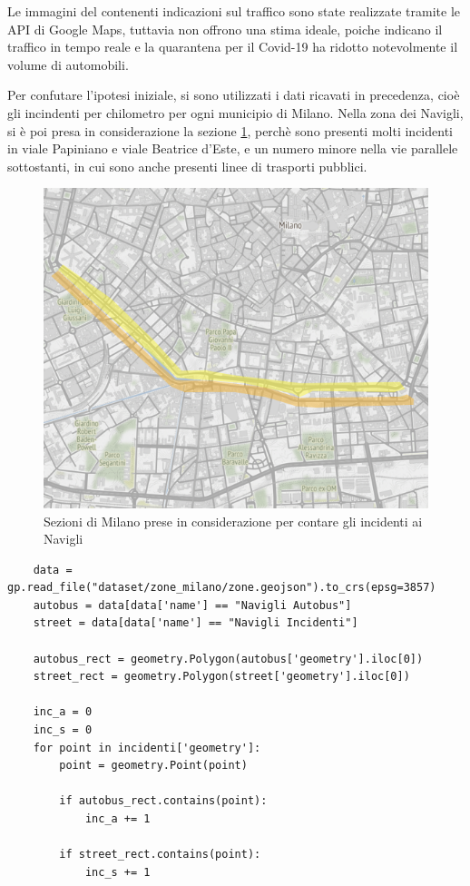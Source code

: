 \documentclass[a4paper,12pt]{report}
\begin{document}
Le immagini del contenenti indicazioni sul traffico sono state realizzate tramite le API di 
Google Maps, tuttavia non offrono una stima ideale, poiche indicano il traffico in tempo reale e 
la quarantena per il Covid-19 ha ridotto notevolmente il volume di automobili.

Per confutare l'ipotesi iniziale, si sono utilizzati i dati ricavati in precedenza, 
cioè gli incindenti per chilometro per ogni municipio di Milano. 
Nella zona dei Navigli, si è poi presa in considerazione la sezione \ref{fig:zona-navigli-rect}, 
perchè sono presenti molti incidenti in viale Papiniano e viale Beatrice d'Este, 
e un numero minore nella vie parallele sottostanti, in cui sono anche presenti 
linee di trasporti pubblici.

\begin{figure}
    \includegraphics[width=\linewidth]{../src/atm/zona_navigli_rect.png}
    \caption{Sezioni di Milano prese in considerazione per contare gli incidenti ai Navigli}
    \label{fig:zona-navigli-rect}
\end{figure}

\begin{lstlisting}
    data = gp.read_file("dataset/zone_milano/zone.geojson").to_crs(epsg=3857)
    autobus = data[data['name'] == "Navigli Autobus"]
    street = data[data['name'] == "Navigli Incidenti"]

    autobus_rect = geometry.Polygon(autobus['geometry'].iloc[0])
    street_rect = geometry.Polygon(street['geometry'].iloc[0])

    inc_a = 0
    inc_s = 0
    for point in incidenti['geometry']: 
        point = geometry.Point(point)

        if autobus_rect.contains(point): 
            inc_a += 1
        
        if street_rect.contains(point): 
            inc_s += 1
\end{lstlisting}
\end{document}
